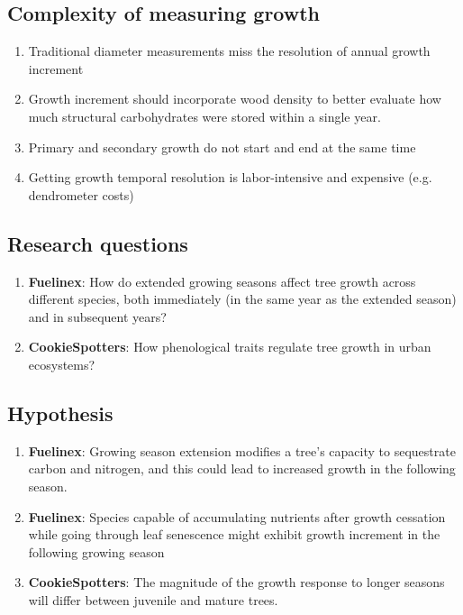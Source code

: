 \documentclass{article}
\begin{document}
\subsection{Complexity of measuring growth}
\begin{enumerate}
	\item Traditional diameter measurements miss the resolution of annual growth increment
	\item Growth increment should incorporate wood density to better evaluate how much structural carbohydrates were stored within a single year.
	\item Primary and secondary growth do not start and end at the same time
	\item Getting growth temporal resolution is labor-intensive and expensive (e.g. dendrometer costs)
\end{enumerate}

\subsection {Research questions} %
\begin {enumerate}
	\item \textbf{Fuelinex}: How do extended growing seasons affect tree growth across different species, both immediately (in the same year as the extended season) and in subsequent years?
	\item \textbf {CookieSpotters}: How phenological traits regulate tree growth in urban ecosystems?
\end {enumerate}

\subsection{Hypothesis}
\begin {enumerate}
	\item \textbf{Fuelinex}: Growing season extension modifies a tree’s capacity to sequestrate carbon and nitrogen, and this could lead to increased growth in the following season.
	\item \textbf{Fuelinex}: Species capable of accumulating nutrients after growth cessation while going through leaf senescence might exhibit growth increment in the following growing season
	\item \textbf{CookieSpotters}: The magnitude of the growth response to longer seasons will differ between juvenile and mature trees.
\end {enumerate}
\end{document}
